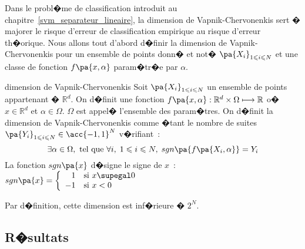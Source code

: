 


Dans le probl�me de classification introduit au chapitre~\ref{svm_separateur_lineaire}, la dimension de Vapnik-Chervonenkis sert � majorer le risque d'erreur de classification empirique au risque d'erreur th�orique. Nous allons tout d'abord d�finir la dimension de Vapnik-Chervonenkis pour un ensemble de points donn� et not� $\pa{X_i}_{1 \leqslant i \leqslant N}$ et une classe de fonction $f\pa{x,\alpha}$ param�tr�e par $\alpha$.



            \begin{xdefinition}{dimension de Vapnik-Chervonenkis}
            Soit $\pa{X_i}_{1 \leqslant i \leqslant N}$ un ensemble de points appartenant � $\mathbb{R}^d$. On d�finit une 
            fonction $f\pa{x,\alpha} : \mathbb{R}^d \times \Omega \longmapsto  \mathbb{R}$ 
            o� $x \in \mathbb{R}^d$ et $\alpha \in \Omega$.
            $\Omega$ est appel� l'ensemble des param�tres.
            On d�finit la dimension de Vapnik-Chervonenkis comme �tant le nombre de suites 
            $\pa{Y_i}_{1 \leqslant i \leqslant N} \in \acc{-1,1}^N$ v�rifiant~:
                    $$
                    \exists \alpha \in \Omega, \text{ tel que } \forall i, \; 1 \leqslant i \leqslant N, \;
                            sgn\pa{ f\pa{X_i,\alpha} } = Y_i
                    $$
            La fonction $sgn\pa{x}$ d�signe le signe de $x$~: $sgn\pa{x} = \left\{ \begin{array}{rl}
                                                                                                                         1 & \text{si } x \supegal 0 \\
                                                                                                                        -1 & \text{si } x < 0 
                                                                                                                        \end{array} \right. $
                                                                                                                        
            Par d�finition, cette dimension est inf�rieure � $2^N$.
            \end{xdefinition}





\subsection{R�sultats}
\label{svm_dimension_vc_lin}


